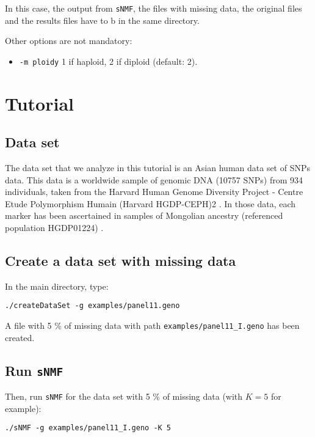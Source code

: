 \documentclass[10pt,a4paper]{article}
\begin{document}
\begin{itemize}
In this case, the output from {\tt sNMF}, the files with missing data, the original files and the results files 
have to b  in the same directory.

\noindent
Other options are not mandatory:
\begin{itemize}
\item \verb|-m ploidy|  1 if haploid, 2 if diploid (default: 2). 
\end{itemize}

\end{itemize}

\section{Tutorial}

\subsection{Data set}
The data set that we analyze in this tutorial is an Asian human data set of SNPs data.
This data is a worldwide sample of genomic DNA (10757 SNPs) from 934 individuals,
taken from the Harvard Human Genome Diversity Project - Centre
Etude Polymorphism Humain (Harvard HGDP-CEPH)2 . 
In those data, each marker has been ascertained in samples of Mongolian
ancestry (referenced population HGDP01224) \cite{Patterson_2012}. 

\subsection{Create a data set with missing data}

In the main directory, type:
\begin{Verbatim}[frame=single]
./createDataSet -g examples/panel11.geno
\end{Verbatim}

\noindent
A file with 5 \% of missing data with path \verb|examples/panel11_I.geno| has been created.

\subsection{Run {\tt sNMF}}

Then, run {\tt sNMF} for the data set with 5 \% of missing data (with $K=5$ for example):
\begin{Verbatim}[frame=single]
./sNMF -g examples/panel11_I.geno -K 5
\end{Verbatim}
\end{document}
